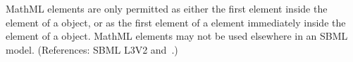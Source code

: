 MathML  elements are only permitted as either the first
element inside the  element of a \FunctionDefinition object, or
as the first element of a  element immediately inside the
 element of a \FunctionDefinition object.  MathML
 elements may not be used elsewhere in an SBML model.
(References: SBML L3V2 
and~.)

